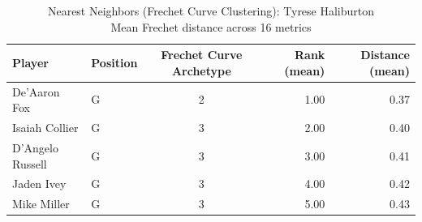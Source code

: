 \begin{table}[t]
\caption*{
{\fontsize{20}{25} Nearest Neighbors (Frechet Curve Clustering): Tyrese Haliburton\fontsize{12}{15}\selectfont } \\ 
{\fontsize{14}{17}\selectfont  Mean Frechet distance across 16 metrics\fontsize{12}{15}\selectfont }
} 
\fontsize{12.0pt}{14.0pt}\selectfont
\begin{tabular*}{\linewidth}{@{\extracolsep{\fill}}llcrr}
\toprule
Player & Position & Frechet Curve Archetype & Rank (mean) & Distance (mean) \\ 
\midrule\addlinespace[2.5pt]
De'Aaron Fox & G & 2 & 1.00 & 0.37 \\ 
Isaiah Collier & G & 3 & 2.00 & 0.40 \\ 
D'Angelo Russell & G & 3 & 3.00 & 0.41 \\ 
Jaden Ivey & G & 3 & 4.00 & 0.42 \\ 
Mike Miller & G & 3 & 5.00 & 0.43 \\ 
\bottomrule
\end{tabular*}
\end{table}

